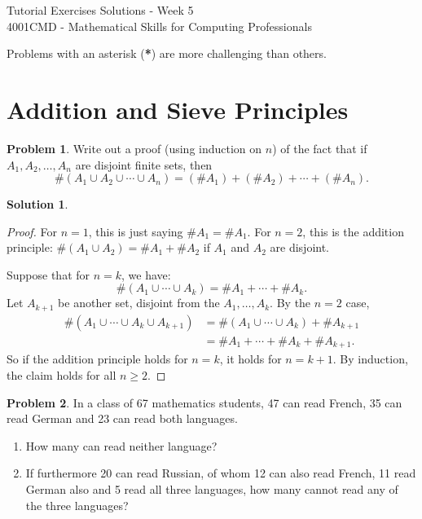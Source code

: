\documentclass[12pt,a4paper]{article}
\numberwithin{equation}{section}
\theoremstyle{plain}
\theoremstyle{definition}
\newtheorem{problem}{Problem}
\theoremstyle{solutionstyle}
\newtheorem*{solution*}{Solution} %
\theoremstyle{definition} %
\begin{document}
	
	\begin{center}
		\Large{Tutorial Exercises Solutions - Week 5} \\
		\vspace{3mm}
		\large{4001CMD - Mathematical Skills for Computing Professionals} \\
		\vspace{5mm}
	\end{center}
	
	
Problems with an asterisk (\textbf{*}) are more challenging than others.
	
	\section*{Addition and Sieve Principles}
	
	\begin{problem}
		Write out a proof (using induction on $n$) of the fact that if $A_1, A_2, \ldots, A_n$ are disjoint finite sets, then \[
		\#\left(A_1 \cup A_2 \cup \cdots \cup A_n\right) = (\#A_1) + (\#A_2) + \cdots + (\#A_n).
		\]
	\end{problem}
	
	\begin{solution*}
		\begin{proof}
			For $n=1$, this is just saying $\#A_1 = \#A_1$. For $n=2$, this is the addition principle: $\#(A_1 \cup A_2) = \#A_1 + \#A_2$ if $A_1$ and $A_2$ are disjoint. 
			
			Suppose that for $n=k$, we have: 
			\[
			\#(A_1 \cup \cdots \cup A_k) = \#A_1 + \cdots + \#A_k.
			\]
			Let $A_{k+1}$ be another set, disjoint from the $A_1, \ldots, A_k$. By the $n=2$ case, 
			\begin{align*}
				\#\left(A_1 \cup \cdots \cup A_k \cup A_{k+1}\right) &= \#\left(A_1 \cup \cdots \cup A_k\right)+ \#A_{k+1} \\
				&= \#A_1 + \cdots + \#A_k + \#A_{k+1}. 
			\end{align*}
			So if the addition principle holds for $n=k$, it holds for $n=k+1$. By induction, the claim holds for all $n \geq 2$. 
		\end{proof}
	\end{solution*}
	
	\begin{problem}
		In a class of 67 mathematics students, 47 can read French, 35 can read German and 23 can read both languages.
		\begin{enumerate}[label=(\alph*)]
			\item How many can read neither language? 
			\item If furthermore 20 can read Russian, of whom 12 can also read French, 11 read German also and 5 read all three languages, how many cannot read any of the three languages? 
		\end{enumerate}
	\end{problem}
	
\end{document}
